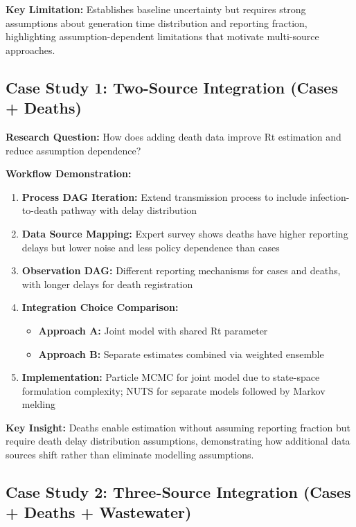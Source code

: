 \documentclass{article}
\begin{document}
\textbf{Key Limitation:} Establishes baseline uncertainty but requires strong assumptions about generation time distribution and reporting fraction, highlighting assumption-dependent limitations that motivate multi-source approaches.

\subsection{Case Study 1: Two-Source Integration (Cases + Deaths)}

\textbf{Research Question:} How does adding death data improve Rt estimation and reduce assumption dependence?

\textbf{Workflow Demonstration:}
\begin{enumerate}
    \item \textbf{Process DAG Iteration:} Extend transmission process to include infection-to-death pathway with delay distribution
    \item \textbf{Data Source Mapping:} Expert survey shows deaths have higher reporting delays but lower noise and less policy dependence than cases
    \item \textbf{Observation DAG:} Different reporting mechanisms for cases and deaths, with longer delays for death registration
    \item \textbf{Integration Choice Comparison:} 
        \begin{itemize}
            \item \textbf{Approach A:} Joint model with shared Rt parameter
            \item \textbf{Approach B:} Separate estimates combined via weighted ensemble
        \end{itemize}
    \item \textbf{Implementation:} Particle MCMC for joint model due to state-space formulation complexity; NUTS for separate models followed by Markov melding
\end{enumerate}

\textbf{Key Insight:} Deaths enable estimation without assuming reporting fraction but require death delay distribution assumptions, demonstrating how additional data sources shift rather than eliminate modelling assumptions.

\subsection{Case Study 2: Three-Source Integration (Cases + Deaths + Wastewater)}
\end{document}
